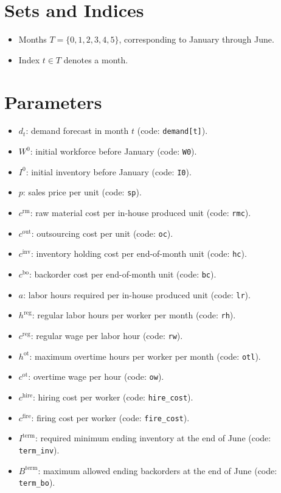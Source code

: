 \section*{Sets and Indices}

\begin{itemize}
    \item Months \(T=\{0,1,2,3,4,5\}\), corresponding to January through June.
    \item Index \(t \in T\) denotes a month.
\end{itemize}

\section*{Parameters}

\begin{itemize}
    \item \(d_t\): demand forecast in month \(t\) (code: \texttt{demand[t]}).
    \item \(W^0\): initial workforce before January (code: \texttt{W0}).
    \item \(I^0\): initial inventory before January (code: \texttt{I0}).
    \item \(p\): sales price per unit (code: \texttt{sp}).
    \item \(c^{\mathrm{rm}}\): raw material cost per in-house produced unit (code: \texttt{rmc}).
    \item \(c^{\mathrm{out}}\): outsourcing cost per unit (code: \texttt{oc}).
    \item \(c^{\mathrm{inv}}\): inventory holding cost per end-of-month unit (code: \texttt{hc}).
    \item \(c^{\mathrm{bo}}\): backorder cost per end-of-month unit (code: \texttt{bc}).
    \item \(a\): labor hours required per in-house produced unit (code: \texttt{lr}).
    \item \(h^{\mathrm{reg}}\): regular labor hours per worker per month (code: \texttt{rh}).
    \item \(c^{\mathrm{reg}}\): regular wage per labor hour (code: \texttt{rw}).
    \item \(h^{\mathrm{ot}}\): maximum overtime hours per worker per month (code: \texttt{otl}).
    \item \(c^{\mathrm{ot}}\): overtime wage per hour (code: \texttt{ow}).
    \item \(c^{\mathrm{hire}}\): hiring cost per worker (code: \texttt{hire\_cost}).
    \item \(c^{\mathrm{fire}}\): firing cost per worker (code: \texttt{fire\_cost}).
    \item \(I^{\mathrm{term}}\): required minimum ending inventory at the end of June (code: \texttt{term\_inv}).
    \item \(B^{\mathrm{term}}\): maximum allowed ending backorders at the end of June (code: \texttt{term\_bo}).
\end{itemize}

